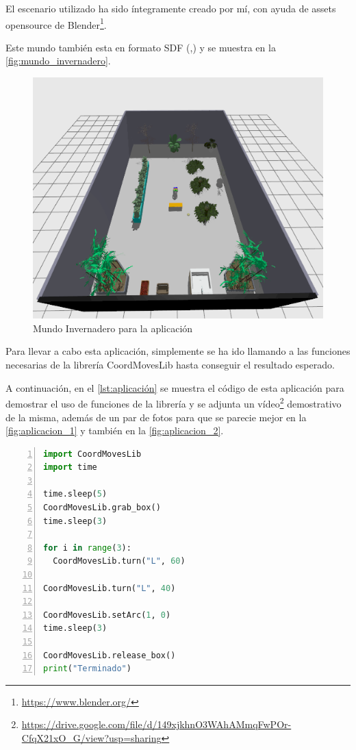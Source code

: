 El escenario utilizado ha sido íntegramente creado por mí, con ayuda de assets opensource de Blender\footnote{\url{https://www.blender.org/}}. 

Este mundo también esta en formato SDF (\cite{tutorial_mallas},\cite{parametros_fisicos_gazebo}) y se muestra en la \autoref{fig:mundo_invernadero}.

\begin{figure}[H]
  \centering
  \includegraphics[width=1\textwidth]{figures/cap_4/mundo_invernadero.png}
  \caption{Mundo Invernadero para la aplicación}
  \label{fig:mundo_invernadero}
\end{figure}

Para llevar a cabo esta aplicación, simplemente se ha ido llamando a las funciones necesarias de la librería CoordMovesLib hasta conseguir el resultado esperado.

A continuación, en el \autoref{lst:aplicación} se muestra el código de esta aplicación para demostrar el uso de funciones de la librería y se adjunta un vídeo\footnote{\url{https://drive.google.com/file/d/149xjkhnO3WAhAMmqFwPOr-CfqX21xO_G/view?usp=sharing}} demostrativo de la misma, además de un par de  fotos para que se parecie mejor en la \autoref{fig:aplicacion_1} y también en la \autoref{fig:aplicacion_2}.

\begin{lstlisting}[language=Python, caption={Aplicación GreenNao}, label={lst:aplicación}, numbers=left, backgroundcolor=\color{gray!10}]
import CoordMovesLib
import time

time.sleep(5)
CoordMovesLib.grab_box()
time.sleep(3)

for i in range(3):
  CoordMovesLib.turn("L", 60)

CoordMovesLib.turn("L", 40)

CoordMovesLib.setArc(1, 0)
time.sleep(3)

CoordMovesLib.release_box()
print("Terminado")
\end{lstlisting}


